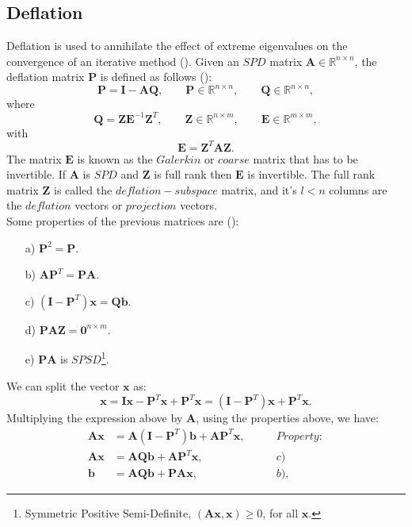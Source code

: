 \documentclass{ecmorXV}
\begin{document}
\subsection{Deflation}\label{def}
\hspace{0.5cm}Deflation is used to annihilate the effect of extreme eigenvalues on the convergence of an iterative method (\cite{Vuik99}). 
Given an $SPD$ matrix $\mathbf{A} \in \mathbb{R}^{n \times n}$, the deflation matrix $\mathbf{P}$ is defined as follows (\cite{Tang08}):
$$\mathbf{P}=\mathbf{I}-\mathbf{A}\mathbf{Q}, \qquad \mathbf{P} \in \mathbb{R}^{n \times n}, \qquad \mathbf{Q} \in \mathbb{R}^{n \times n},$$
where
$$\mathbf{Q}=\mathbf{Z}\mathbf{E}^{-1}\mathbf{Z}^T, \qquad \mathbf{Z} \in \mathbb{R}^{n \times m}, \qquad \mathbf{E} \in \mathbb{R}^{m \times m}, $$
with
$$\mathbf{E}=\mathbf{Z}^T\mathbf{A}\mathbf{Z}.$$
The matrix $\mathbf{E}$ is known as the $Galerkin$ or $coarse$ matrix that has to be invertible. 
If $\mathbf{A}$ is $SPD$ and $\mathbf{Z}$ is full rank then $\mathbf{E}$ is invertible. 
The full rank matrix $\mathbf{Z}$ is called the $deflation-subspace$ matrix, 
and it's $l<n$ columns are the
$deflation$ vectors or $projection$ vectors.\\
Some properties of the previous matrices are (\cite[pag. 27]{Tang08}):
\begin{enumerate}\label{defprop}
 \item[a)] $\mathbf{P}^2=\mathbf{P}.$
 \item[b)] $\mathbf{A}\mathbf{P}^T=\mathbf{P}\mathbf{A}.$
 \item[c)] $(\mathbf{I}-\mathbf{P}^T)\mathbf{x}=\mathbf{Q}\mathbf{b}.$
 \item[d)] $\mathbf{P}\mathbf{A}\mathbf{Z}=\mathbf{0}^{n\times m}.$
 \item[e)] $\mathbf{P}\mathbf{A}$ is $SPSD$\footnote{Symmetric Positive Semi-Definite, $(\mathbf{A}\mathbf{x},\mathbf{x})\geq 0$, for all $\mathbf{x}$.}.
\end{enumerate}
We can split the vector $\mathbf{x}$ as:
\begin{equation}\label{eq:splx}
    \mathbf{x}=\mathbf{I}\mathbf{x}-\mathbf{P}^T\mathbf{x}+\mathbf{P}^T\mathbf{x}=(\mathbf{I}-\mathbf{P}^T)\mathbf{x}+\mathbf{P}^T\mathbf{x}.
\end{equation}
Multiplying the expression above by $\mathbf{A}$, using the properties above, we have:
\begin{align*}
\mathbf{A}\mathbf{x}&=\mathbf{A}(\mathbf{I}-\mathbf{P}^T)\mathbf{b}+\mathbf{A}\mathbf{P}^T\mathbf{x},\qquad&Property:\\
\mathbf{A}\mathbf{x}&=\mathbf{A}\mathbf{Q}\mathbf{b}+\mathbf{A}\mathbf{P}^T\mathbf{x},&c)\\
\mathbf{b}&=\mathbf{A}\mathbf{Q}\mathbf{b}+\mathbf{P}\mathbf{A}\mathbf{x},&b),
\end{align*}
\end{document}
